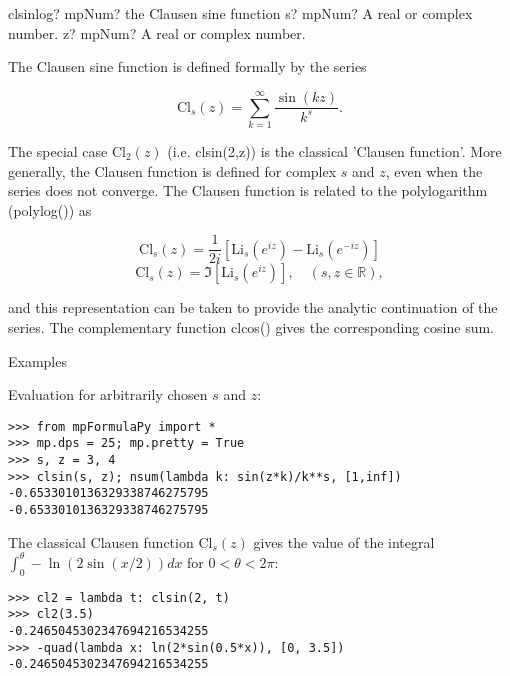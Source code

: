\begin{mpFunctionsExtract}
	\mpFunctionTwo
	{clsinlog? mpNum? the Clausen sine function}
	{s? mpNum? A real or complex number.}
	{z? mpNum? A real or complex number.}		
\end{mpFunctionsExtract}

\vpara
The Clausen sine function is defined formally by the series

\begin{equation}
\text{Cl}_s(z) = \sum_{k=1}^{\infty} \frac{\sin(kz)}{k^s}.
\end{equation}

The special case $\text{Cl}_2(z)$ (i.e. clsin(2,z)) is the classical 'Clausen function'. More generally, the Clausen function is defined for complex $s$ and $z$, even when the series does not converge. The Clausen function is related to the polylogarithm (polylog()) as

\begin{equation}
\text{Cl}_s(z) = \frac{1}{2i}\left[ \text{Li}_s\left(e^{iz}\right) - \text{Li}_s\left(e^{-iz}\right) \right]
\end{equation}
\begin{equation}
\text{Cl}_s(z) = \Im\left[ \text{Li}_s\left(e^{iz}\right) \right], \quad (s,z \in \mathbb{R}),
\end{equation}

and this representation can be taken to provide the analytic continuation of the series. The complementary function clcos() gives the corresponding cosine sum.

Examples

Evaluation for arbitrarily chosen $s$ and $z$:

\begin{lstlisting}
>>> from mpFormulaPy import *
>>> mp.dps = 25; mp.pretty = True
>>> s, z = 3, 4
>>> clsin(s, z); nsum(lambda k: sin(z*k)/k**s, [1,inf])
-0.6533010136329338746275795
-0.6533010136329338746275795
\end{lstlisting}

The classical Clausen function $\text{Cl}_s(z)$ gives the value of the integral $\int_0^{\theta} -\ln(2\sin(x/2)) dx$ for $0<\theta<2\pi$:

\begin{lstlisting}
>>> cl2 = lambda t: clsin(2, t)
>>> cl2(3.5)
-0.2465045302347694216534255
>>> -quad(lambda x: ln(2*sin(0.5*x)), [0, 3.5])
-0.2465045302347694216534255
\end{lstlisting}



